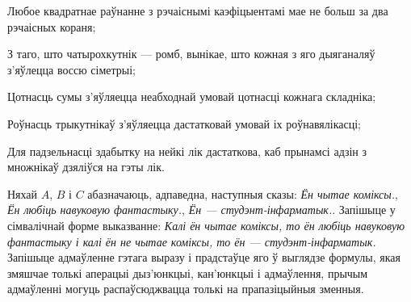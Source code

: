 \begin{problemList}
\begin{belarusianEnumerate}
\item Любое квадратнае раўнанне з рэчаіснымі каэфіцыентамі мае не больш за два рэчаісных кораня; \\

\item З таго, што чатырохкутнік --- ромб, вынікае, што кожная з яго дыяганаляў з'яўлецца воссю сіметрыі; \\

\item Цотнасць сумы з'яўляецца неабходнай умовай цотнасці кожнага складніка; \\

\item Роўнасць трыкутнікаў з'яўляецца дастатковай умовай іх роўнавялікасці; \\

\item Для падзельнасці здабытку на нейкі лік дастаткова, каб прынамсі адзін з множнікаў дзяліўся на гэты лік. \\

\end{belarusianEnumerate}

\item
Няхай $A$, $B$ і $C$ абазначаюць, адпаведна, наступныя сказы:
\textit{\guillemotleft Ён чытае коміксы.\guillemotright},
\textit{\guillemotleft Ён любіць навуковую фантастыку.\guillemotright},
\textit{\guillemotleft Ён --- студэнт-інфарматык.\guillemotright}.
Запішыце у сімвалічнай форме выказванне: \textit{\guillemotleft Калі ён чытае коміксы,
то ён любіць навуковую фантастыку і калі ён не чытае коміксы, то ён ---
студэнт-інфарматык.\guillemotright} Запішыце адмаўленне гэтага выразу і прадстаўце яго ў выглядзе формулы,
якая змяшчае толькі аперацыі дыз'юнкцыі, кан'юнкцыі і адмаўлення, прычым адмаўленні могуць распаўсюджвацца
толькі на прапазіцыйныя зменныя.

\noindent
{}


\end{problemList}
